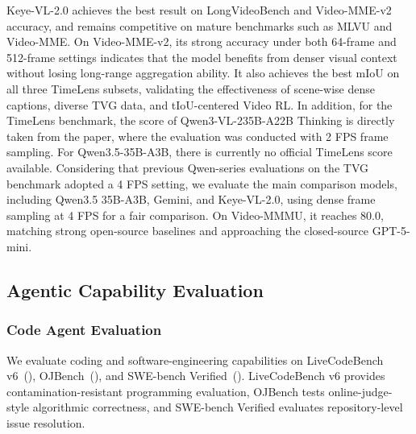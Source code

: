 \documentclass{llmxive}
\begin{document}
Keye-VL-2.0 achieves the best result on LongVideoBench and Video-MME-v2 accuracy, and remains competitive on mature benchmarks such as MLVU and Video-MME. On Video-MME-v2, its strong accuracy under both 64-frame and 512-frame settings indicates that the model benefits from denser visual context without losing long-range aggregation ability. It also achieves the best mIoU on all three TimeLens subsets, validating the effectiveness of scene-wise dense captions, diverse TVG data, and tIoU-centered Video RL. In addition, for the TimeLens benchmark, the score of Qwen3-VL-235B-A22B Thinking is directly taken from the paper, where the evaluation was conducted with 2 FPS frame sampling. For Qwen3.5-35B-A3B, there is currently no official TimeLens score available. Considering that previous Qwen-series evaluations on the TVG benchmark adopted a 4 FPS setting, we evaluate the main comparison models, including Qwen3.5 35B-A3B, Gemini, and Keye-VL-2.0, using dense frame sampling at 4 FPS for a fair comparison. On Video-MMMU, it reaches $80.0$, matching strong open-source baselines and approaching the closed-source GPT-5-mini.

\subsection{Agentic Capability Evaluation}

\subsubsection{Code Agent Evaluation}

We evaluate coding and software-engineering capabilities on LiveCodeBench v6~(\cite{livecodebench}), OJBench~(\cite{ojbench}), and SWE-bench Verified~(\cite{swe_bench_verified}). LiveCodeBench v6 provides contamination-resistant programming evaluation, OJBench tests online-judge-style algorithmic correctness, and SWE-bench Verified evaluates repository-level issue resolution.
\end{document}
